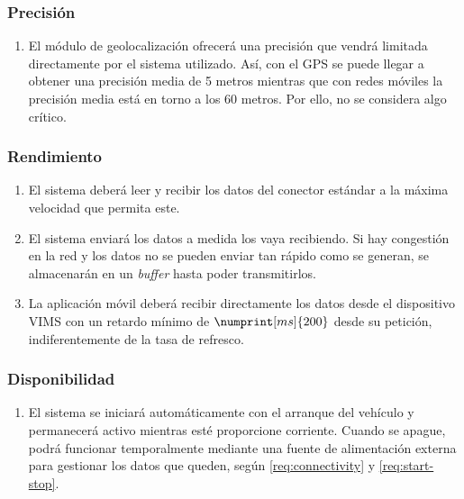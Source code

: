 \subsubsection{Precisión}
\begin{enumerate}[label=\textbf{\texttt{RNF-\arabic*}}]
  \item\label{nf:accuracy} El módulo de geolocalización ofrecerá una precisión
  que vendrá limitada directamente por el sistema utilizado. Así, con el GPS se
  puede llegar a obtener una precisión media de 5 metros mientras que con redes
  móviles la precisión media está en torno a los 60 metros. Por ello, no se considera algo crítico.
\end{enumerate}

\subsubsection{Rendimiento}
\begin{enumerate}[resume, label=\textbf{\texttt{RNF-\arabic*}}]
  \item\label{nf:read-speed} El sistema deberá leer y recibir los datos del
  conector estándar a la máxima velocidad que permita este.
  \item\label{nf:transmission-speed} El sistema enviará los datos a medida los
  vaya recibiendo. Si hay congestión en la red y los datos no se pueden enviar tan
  rápido como se generan, se almacenarán en un \textit{buffer} hasta poder transmitirlos.
  \item\label{nf:rt-viewer} La aplicación móvil deberá recibir directamente los
  datos desde el dispositivo \ac{VIMS} con un retardo mínimo de $\numprint[ms]{200}$
  desde su petición, indiferentemente de la tasa de refresco.
\end{enumerate}

\subsubsection{Disponibilidad}
\begin{enumerate}[resume, label=\textbf{\texttt{RNF-\arabic*}}]
  \item\label{nf:start} El sistema se iniciará automáticamente con el arranque
  del vehículo y permanecerá activo mientras esté proporcione corriente. Cuando
  se apague, podrá funcionar temporalmente mediante una fuente de alimentación
  externa para gestionar los datos que queden, según \ref{req:connectivity} y
  \ref{req:start-stop}.
\end{enumerate}


